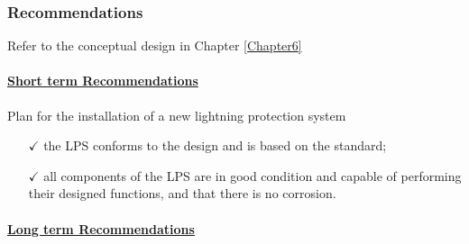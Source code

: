 \subsubsection{Recommendations}

Refer to the conceptual design in Chapter \ref{Chapter6}

\paragraph{\underline{Short term Recommendations}}

Plan for the installation of a new lightning protection system 
\begin{itemize}%
	\item [$\checkmark$] the LPS conforms to the design and is based on the  standard;
	\item [$\checkmark$] all components of the LPS are in good condition and capable of performing their designed functions, and that there is no corrosion.
\end{itemize}


\paragraph{\underline{Long term Recommendations}}

